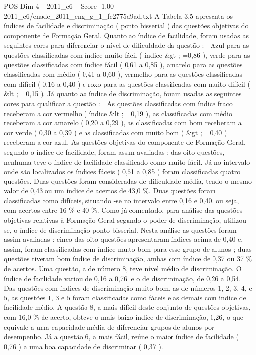 \begin{textsample}{POS Dim 4 – 2011\_c6 – Score -1.00 – 2011\_c6/enade\_2011\_eng\_g\_1\_fc2775d9ad.txt}
A Tabela 3.5 apresenta os índices de facilidade e discriminação ( ponto bisserial ) das questões objetivas do componente de Formação Geral.
Quanto ao índice de facilidade, foram usadas as seguintes cores para diferenciar o nível de dificuldade da questão :  Azul para as questões classificadas com índice muito fácil ( índice \&gt ; =0,86 ), verde para as questões classificadas com índice fácil ( 0,61 a 0,85 ), amarelo para as questões classificadas com médio ( 0,41 a 0,60 ), vermelho para as questões classificadas com difícil ( 0,16 a 0,40 ) e roxo para as questões classificadas com muito difícil ( \&lt ; =0,15 ).
Já quanto ao índice de discriminação, foram usadas as seguintes cores para qualificar a questão :  As questões classificadas com índice fraco receberam a cor vermelho ( índice \&lt ; =0,19 ), as classificadas com médio receberam a cor amarelo ( 0,20 a 0,29 ), as classificadas com bom receberam a cor verde ( 0,30 a 0,39 ) e as classificadas com muito bom ( \&gt ; =0,40 ) receberam a cor azul.
As questões objetivas do componente de Formação Geral, segundo o índice de facilidade, foram assim avaliadas : das oito questões, nenhuma teve o índice de facilidade classificado como muito fácil.
Já no intervalo onde são localizados os índices fáceis ( 0,61 a 0,85 ) foram classificadas quatro questões.
Duas questões foram consideradas de dificuldade média, tendo o mesmo valor de 0,43 ou um índice de acertos de 43,0 \%.
Duas questões foram classificadas como difíceis, situando -se no intervalo entre 0,16 e 0,40, ou seja, com acertos entre 16 \% e 40 \%.
Como já comentado, para análise das questões objetivas relativas à Formação Geral segundo o poder de discriminação, utilizou -se, o índice de discriminação ponto bisserial.
Nesta análise as questões foram assim avaliadas : cinco das oito questões apresentaram índices acima de 0,40 e, assim, foram classificadas com índice muito bom para esse grupo de alunos ; duas questões tiveram bom índice de discriminação, ambas com índice de 0,37 ou 37 \% de acertos.
Uma questão, a de número 8, teve nível médio de discriminação.
O índice de facilidade variou de 0,16 a 0,76, e o de discriminação, de 0,26 a 0,54.
Das questões com índices de discriminação muito bom, as de números 1, 2, 3, 4, e 5, as questões 1, 3 e 5 foram classificadas como fáceis e as demais com índice de facilidade médio.
A questão 8, a mais difícil deste conjunto de questões objetivas, com 16,0 \% de acerto, obteve o mais baixo índice de discriminação, 0,26, o que equivale a uma capacidade média de diferenciar grupos de alunos por desempenho.
Já a questão 6, a mais fácil, reúne o maior índice de facilidade ( 0,76 ) a uma boa capacidade de discriminar ( 0,37 ).

\end{textsample}
